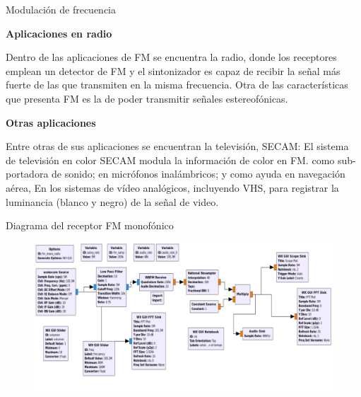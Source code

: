 \begin{frame}{Modulación de frecuencia}

\textbf{Aplicaciones en radio}

Dentro de las aplicaciones de FM se encuentra la radio, donde los receptores emplean un detector de FM y el sintonizador es capaz de recibir la señal más fuerte de las que transmiten en la misma frecuencia. Otra de las características que presenta FM es la de poder transmitir señales estereofónicas. \\ \vspace{2mm}

\textbf{Otras aplicaciones}

Entre otras de sus aplicaciones se encuentran la televisión, SECAM: El sistema de televisión en color SECAM modula la información de color en FM. como sub-portadora de sonido; en micrófonos inalámbricos; y como ayuda en navegación aérea, En los sistemas de vídeo analógicos, incluyendo VHS, para registrar la luminancia (blanco y negro) de la señal de video\cite{Wikipedia8}.\\ \vspace{2mm}


\end{frame}

\begin{frame}{Diagrama del receptor FM monofónico}

\begin{figure}[H]
\centering
\vspace{-3mm}
\includegraphics[width=\textwidth]{parte3/lab8/pdf/lab8_1.pdf}
\end{figure}

\end{frame}

